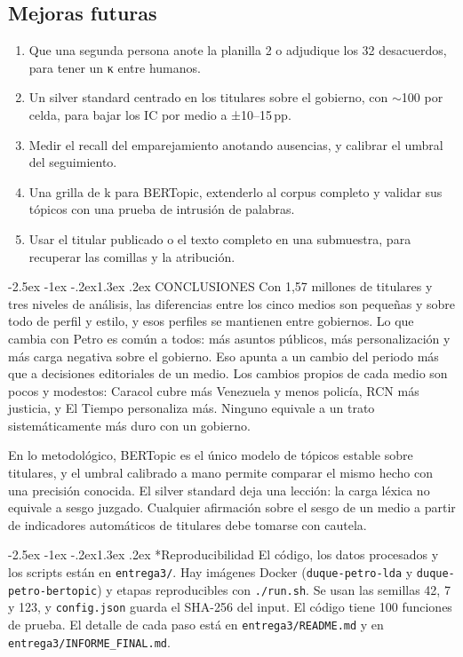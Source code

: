 \documentclass[10pt,twocolumn]{article}
\makeatletter
\renewcommand{\section}{\@startsection{section}{1}{\z@}%
  {-2.5ex \@plus -1ex \@minus -.2ex}{1.3ex \@plus .2ex}%
  {\normalfont\large\bfseries\centering}}
\newcommand{\pp}{\,pp}
\makeatother
\begin{document}
\subsection{Mejoras futuras}
\begin{enumerate}
\item Que una segunda persona anote la planilla 2 o adjudique los 32
desacuerdos, para tener un κ entre humanos.
\item Un silver standard centrado en los titulares sobre el gobierno, con
$\sim$100 por celda, para bajar los IC por medio a ±10--15\pp.
\item Medir el recall del emparejamiento anotando ausencias, y calibrar el umbral
del seguimiento.
\item Una grilla de k para BERTopic, extenderlo al corpus completo y validar sus
tópicos con una prueba de intrusión de palabras.
\item Usar el titular publicado o el texto completo en una submuestra, para
recuperar las comillas y la atribución.
\end{enumerate}

\section{CONCLUSIONES}
Con 1,57 millones de titulares y tres niveles de análisis, las diferencias entre
los cinco medios son pequeñas y sobre todo de perfil y estilo, y esos perfiles se
mantienen entre gobiernos. Lo que cambia con Petro es común a todos: más asuntos
públicos, más personalización y más carga negativa sobre el gobierno. Eso apunta
a un cambio del periodo más que a decisiones editoriales de un medio. Los cambios
propios de cada medio son pocos y modestos: Caracol cubre más Venezuela y menos
policía, RCN más justicia, y El Tiempo personaliza más. Ninguno equivale a un
trato sistemáticamente más duro con un gobierno.

En lo metodológico, BERTopic es el único modelo de tópicos estable sobre
titulares, y el umbral calibrado a mano permite comparar el mismo hecho con una
precisión conocida. El silver standard deja una lección: la carga léxica no
equivale a sesgo juzgado. Cualquier afirmación sobre el sesgo de un medio a
partir de indicadores automáticos de titulares debe tomarse con cautela.

\section*{Reproducibilidad}
El código, los datos procesados y los scripts están en \texttt{entrega3/}.
Hay imágenes Docker (\texttt{duque-petro-lda} y \texttt{duque-petro-bertopic}) y
etapas reproducibles con \texttt{./run.sh}. Se usan las semillas 42, 7 y 123, y
\texttt{config.json} guarda el SHA-256 del input. El código tiene 100 funciones
de prueba. El detalle de cada paso está en \texttt{entrega3/README.md} y en
\texttt{entrega3/INFORME\_FINAL.md}.
\end{document}
